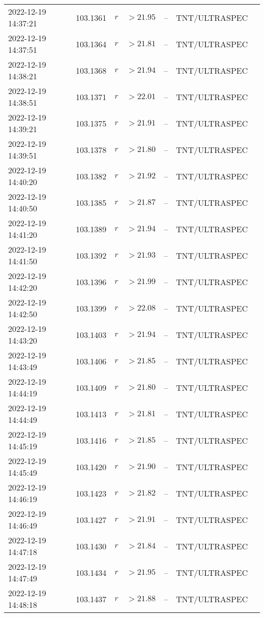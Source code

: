 \documentclass{nature_plusfigure}
\begin{document}
\begin{supplement}
\begin{center}
\begin{longtable}{lllllll}
2022-12-19 14:37:21 & 103.1361 & $r$ & $>21.95$ & -- & TNT/ULTRASPEC &  \\ 
2022-12-19 14:37:51 & 103.1364 & $r$ & $>21.81$ & -- & TNT/ULTRASPEC &  \\ 
2022-12-19 14:38:21 & 103.1368 & $r$ & $>21.94$ & -- & TNT/ULTRASPEC &  \\ 
2022-12-19 14:38:51 & 103.1371 & $r$ & $>22.01$ & -- & TNT/ULTRASPEC &  \\ 
2022-12-19 14:39:21 & 103.1375 & $r$ & $>21.91$ & -- & TNT/ULTRASPEC &  \\ 
2022-12-19 14:39:51 & 103.1378 & $r$ & $>21.80$ & -- & TNT/ULTRASPEC &  \\ 
2022-12-19 14:40:20 & 103.1382 & $r$ & $>21.92$ & -- & TNT/ULTRASPEC &  \\ 
2022-12-19 14:40:50 & 103.1385 & $r$ & $>21.87$ & -- & TNT/ULTRASPEC &  \\ 
2022-12-19 14:41:20 & 103.1389 & $r$ & $>21.94$ & -- & TNT/ULTRASPEC &  \\ 
2022-12-19 14:41:50 & 103.1392 & $r$ & $>21.93$ & -- & TNT/ULTRASPEC &  \\ 
2022-12-19 14:42:20 & 103.1396 & $r$ & $>21.99$ & -- & TNT/ULTRASPEC &  \\ 
2022-12-19 14:42:50 & 103.1399 & $r$ & $>22.08$ & -- & TNT/ULTRASPEC &  \\ 
2022-12-19 14:43:20 & 103.1403 & $r$ & $>21.94$ & -- & TNT/ULTRASPEC &  \\ 
2022-12-19 14:43:49 & 103.1406 & $r$ & $>21.85$ & -- & TNT/ULTRASPEC &  \\ 
2022-12-19 14:44:19 & 103.1409 & $r$ & $>21.80$ & -- & TNT/ULTRASPEC &  \\ 
2022-12-19 14:44:49 & 103.1413 & $r$ & $>21.81$ & -- & TNT/ULTRASPEC &  \\ 
2022-12-19 14:45:19 & 103.1416 & $r$ & $>21.85$ & -- & TNT/ULTRASPEC &  \\ 
2022-12-19 14:45:49 & 103.1420 & $r$ & $>21.90$ & -- & TNT/ULTRASPEC &  \\ 
2022-12-19 14:46:19 & 103.1423 & $r$ & $>21.82$ & -- & TNT/ULTRASPEC &  \\ 
2022-12-19 14:46:49 & 103.1427 & $r$ & $>21.91$ & -- & TNT/ULTRASPEC &  \\ 
2022-12-19 14:47:18 & 103.1430 & $r$ & $>21.84$ & -- & TNT/ULTRASPEC &  \\ 
2022-12-19 14:47:49 & 103.1434 & $r$ & $>21.95$ & -- & TNT/ULTRASPEC &  \\ 
2022-12-19 14:48:18 & 103.1437 & $r$ & $>21.88$ & -- & TNT/ULTRASPEC &  \\ 

\end{longtable}
\end{center}
\end{supplement}
\end{document}
